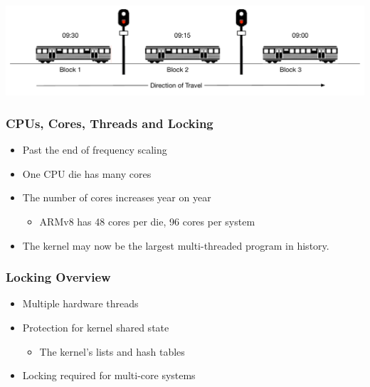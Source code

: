 \documentclass[pdftex]{beamer} %
\begin{document}
\begin{frame}
      \includegraphics[width=\textwidth]{../../figures/block-signaling-3.pdf}
\end{frame}

\begin{frame}
  \frametitle{CPUs, Cores, Threads and Locking}
  \begin{itemize}
  \item Past the end of frequency scaling
  \item One CPU die has many cores
  \item The number of cores increases year on year
    \begin{itemize}
    \item ARMv8 has 48 cores per die, 96 cores per system
    \end{itemize}
  \item The kernel may now be the largest multi-threaded program in history.
  \end{itemize}
\end{frame}

\begin{frame}
  \frametitle{Locking Overview}
  \begin{itemize}
  \item Multiple hardware threads
  \item Protection for kernel shared state
    \begin{itemize}
    \item The kernel's lists and hash tables
    \end{itemize}
  \item Locking required for multi-core systems
  \end{itemize}
\end{frame}
\end{document}
